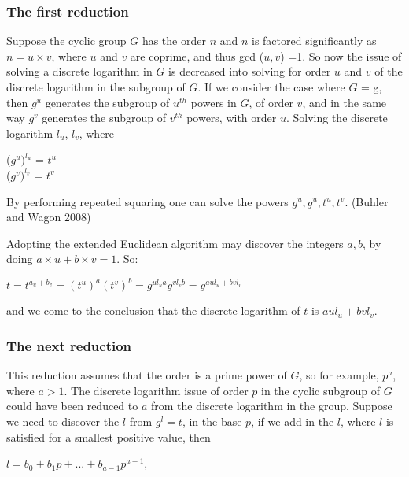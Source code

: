 \documentclass[iwp,first]{luthesis}
\begin{document}
\subsubsection{The first reduction}

Suppose the cyclic group $G$ has the order $n$ and $n$ is factored significantly as $n=u \times v$, where $u$ and $v$ are coprime, and thus gcd ($u,v$) =1. So now the issue of solving a discrete logarithm in $G$ is decreased into solving for order $u$ and $v$ of the discrete logarithm in the subgroup of $G$. If we consider the case where $G$ = g, then $g^u$ generates the subgroup of $u^{th}$ powers in $G$, of order $v$, and in the same way $g^v$ generates the subgroup of $v^{th}$ powers, with order $u$. Solving the discrete logarithm $l_u$, $l_v$, where 

\begin{center}

($g^u)^{l_u}$ = $t^u$
\\
($g^v)^{l_v}$ = $t^v$

\end{center}

By performing repeated squaring one can solve the powers $g^u, g^u, t^u, t^v$. (Buhler and Wagon 2008)

Adopting the extended Euclidean algorithm may discover the integers $a, b$, by doing $a \times u + b \times v =1$. So:

\begin{center}

$t = t^{a_{u}+b_{v}} = (t^u)^{a}(t^v)^{b} = g^{ul_{u}a}g^{vl_{v}b} = g^{aul_{u}+bvl_{v}}$

\end{center}

and we come to the conclusion that the discrete logarithm of $t$ is $aul_{u} + bvl_{v}$.

\subsubsection{The next reduction}

This reduction assumes that the order is a prime power of $G$, so for example, $p^a$, where $a > 1$. The discrete logarithm issue of order $p$ in the cyclic subgroup of $G$ could have been reduced to $a$ from the discrete logarithm in the group. Suppose we need to discover the $l$ from $g^l=t$, in the base $p$, if we add in the $l$, where $l$ is satisfied for a smallest positive value, then 

\begin{center}

$l = b_{0} + b_{1}p + ... + b_{a-1}p^{a-1}$,

\end{center}
\end{document}
